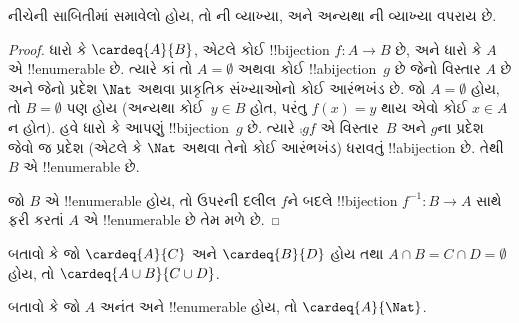 \documentclass[../../../include/open-logic-section]{subfiles}
\begin{document}
\begin{editorial}
નીચેની સાબિતીમાં  સમાવેલો હોય, તો
ની વ્યાખ્યા, અને અન્યથા
ની વ્યાખ્યા વપરાય છે.
\end{editorial}

\begin{proof}
ધારો કે $\cardeq{A}{B}$, એટલે કોઈ !!{bijection}
$f \colon A \to B$ છે, અને ધારો કે $A$ એ !!{enumerable} છે.
{
  ત્યારે કાં તો $A  = \emptyset$ અથવા કોઈ !!a{bijection}~$g$ છે
  જેનો વિસ્તાર $A$ છે અને જેનો પ્રદેશ $\Nat$ અથવા પ્રાકૃતિક
  સંખ્યાઓનો કોઈ આરંભખંડ છે. જો $A = \emptyset$ હોય, તો
  $B = \emptyset$ પણ હોય (અન્યથા કોઈ~$y \in B$ હોત, પરંતુ
  $f(x) = y$ થાય એવો કોઈ $x \in A$ ન હોત). હવે ધારો કે આપણું
  !!{bijection}~$g$ છે. ત્યારે $\comp{g}{f}$ એ વિસ્તાર~$B$ અને
  $g$ના પ્રદેશ જેવો જ પ્રદેશ (એટલે કે $\Nat$ અથવા તેનો કોઈ
  આરંભખંડ) ધરાવતું !!a{bijection} છે. તેથી $B$ એ !!{enumerable} છે.}

જો $B$ એ !!{enumerable} હોય, તો ઉપરની દલીલ $f$ને બદલે
!!{bijection} $f^{-1}\colon B \to A$ સાથે ફરી કરતાં $A$ એ
!!{enumerable} છે તેમ મળે છે.
\end{proof}

\begin{prob}
બતાવો કે જો $\cardeq{A}{C}$ અને $\cardeq{B}{D}$ હોય તથા
$A \cap B = C \cap D = \emptyset$ હોય, તો
$\cardeq{A \cup B}{C \cup D}$.
\end{prob}

\begin{prob}
બતાવો કે જો $A$ અનંત અને !!{enumerable} હોય, તો
$\cardeq{A}{\Nat}$.
\end{prob}
\end{document}
